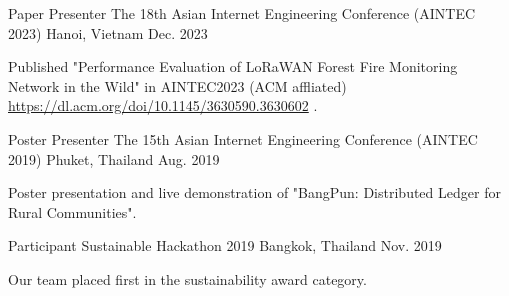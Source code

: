 

\begin{cventries}

  \cventry
  {Paper Presenter} %
  {The 18th Asian Internet Engineering Conference (AINTEC 2023)} %
  {Hanoi, Vietnam} %
  {Dec. 2023} %
  {
  	\begin{cvitems} %
  		\item { Published "Performance Evaluation of LoRaWAN Forest Fire Monitoring Network in the Wild" in AINTEC2023 (ACM affliated) \url{https://dl.acm.org/doi/10.1145/3630590.3630602}  .}
  	\end{cvitems}
  }
	\cventry
    {Poster Presenter} %
    {The 15th Asian Internet Engineering Conference (AINTEC 2019)} %
    {Phuket, Thailand} %
    {Aug. 2019} %
    {
      \begin{cvitems} %
        \item { Poster presentation and live demonstration of "BangPun: Distributed Ledger for Rural Communities".}
      \end{cvitems}
    }

  \cventry
    {Participant} %
    {Sustainable Hackathon 2019} %
    {Bangkok, Thailand} %
    {Nov. 2019} %
    {
      \begin{cvitems} %
      \item { Our team placed first in the sustainability award category. }
      \end{cvitems}
    }

\end{cventries}
